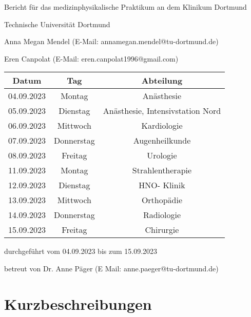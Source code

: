 \documentclass[11pt,a4paper,titlepage]{scrartcl}
\begin{document}
\begin{titlepage}
	\centering
	{\LARGE Bericht für das medizinphysikalische Praktikum an dem Klinikum Dortmund\par}
	\vspace{1.0cm}
	{\huge   \par}
	\vspace{2.5cm}
	{\LARGE Technische Universität Dortmund \par}
	\vspace{0.5cm}
	{\large Anna Megan Mendel (E-Mail:  annamegan.mendel@tu-dortmund.de) \par}
	{\large Eren Canpolat (E-Mail: eren.canpolat1996@gmail.com) \par}
    \vspace{2cm}
	\begin{tabular}{|c|c|c|}
    \hline
    Datum & Tag & Abteilung \\ \hline
    04.09.2023 & Montag & Anästhesie \\ \hline
    05.09.2023 & Dienstag & Anästhesie, Intensivstation Nord \\ \hline
    06.09.2023 & Mittwoch & Kardiologie \\ \hline
    07.09.2023 & Donnerstag & Augenheilkunde \\ \hline
    08.09.2023 & Freitag & Urologie \\ \hline
    11.09.2023 & Montag & Strahlentherapie \\ \hline
    12.09.2023 & Dienstag & HNO- Klinik \\ \hline
    13.09.2023 & Mittwoch & Orthopädie \\ \hline
    14.09.2023 & Donnerstag & Radiologie \\ \hline
    15.09.2023 & Freitag & Chirurgie \\ \hline
\end{tabular}
	\vfill
	durchgeführt vom 04.09.2023 bis zum 15.09.2023\par
	betreut von Dr. Anne Päger (E Mail: anne.paeger@tu-dortmund.de)\par

\end{titlepage}

\tableofcontents

\newpage



\newpage

\section{Kurzbeschreibungen}
\end{document}
